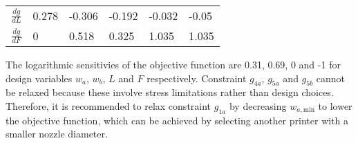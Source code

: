 \begin{table}
\begin{tabular}{c|lllll}
		\textbf{$\frac{d g}{d L}$}   & 0.278                                                   & \cellcolor[HTML]{9AFF99}-0.306                        & -0.192                                                & \cellcolor[HTML]{9AFF99}-0.032                        & \cellcolor[HTML]{9AFF99}-0.05                         \\ 
		\textbf{$\frac{dg}{d F}$}    & 0                                                       & \cellcolor[HTML]{9AFF99}0.518                         & 0.325                                                 & \cellcolor[HTML]{9AFF99}1.035                         & \cellcolor[HTML]{9AFF99}1.035                         \\ 
	\end{tabular}
\end{table}


The logarithmic sensitivies of the objective function are 0.31, 0.69, 0 and -1 for design variables $w_a$, $w_b$, $L$ and $F$ respectively. 
Constraint $g_{4a}$, $g_{5a}$ and $g_{5b}$ cannot be relaxed because these involve stress limitations rather than design choices. 
Therefore, it is recommended to relax constraint $g_{1a}$ by decreasing $w_{a,\text{min}}$ to lower the objective function, 
which can be achieved by selecting another printer with a smaller nozzle diameter.




